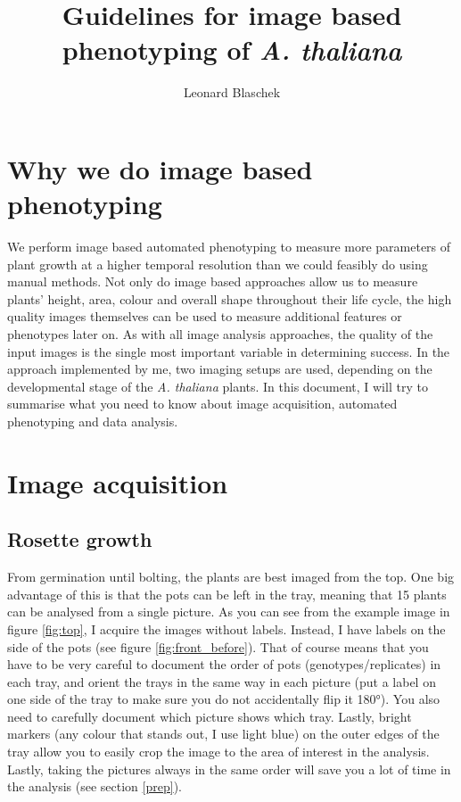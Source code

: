 \documentclass[10pt]{article}
\title{Guidelines for image based phenotyping of \textit{A. thaliana}}
\author{Leonard Blaschek}
\begin{document}
\maketitle

\section*{Why we do image based phenotyping}

We perform image based automated phenotyping to measure more parameters of plant growth at a higher temporal resolution than we could feasibly do using manual methods. Not only do image based approaches allow us to measure plants' height, area, colour and overall shape throughout their life cycle, the high quality images themselves can be used to measure additional features or phenotypes later on. As with all image analysis approaches, the quality of the input images is the single most important variable in determining success. In the approach implemented by me, two imaging setups are used, depending on the developmental stage of the \textit{A. thaliana} plants. In this document, I will try to summarise what you need to know about image acquisition, automated phenotyping and data analysis.

\tableofcontents


\section{Image acquisition}

\subsection{Rosette growth}

From germination until bolting, the plants are best imaged from the top. One big advantage of this is that the pots can be left in the tray, meaning that 15 plants can be analysed from a single picture. As you can see from the example image in figure \ref{fig:top}, I acquire the images without labels. Instead, I have labels on the side of the pots (see figure \ref{fig:front_before}). That of course means that you have to be very careful to document the order of pots (genotypes/replicates) in each tray, and orient the trays in the same way in each picture (put a label on one side of the tray to make sure you do not accidentally flip it 180°). You also need to carefully document which picture shows which tray. Lastly, bright markers (any colour that stands out, I use light blue) on the outer edges of the tray allow you to easily crop the image to the area of interest in the analysis. Lastly, taking the pictures always in the same order will save you a lot of time in the analysis (see section \ref{prep}).
	
\end{document}
